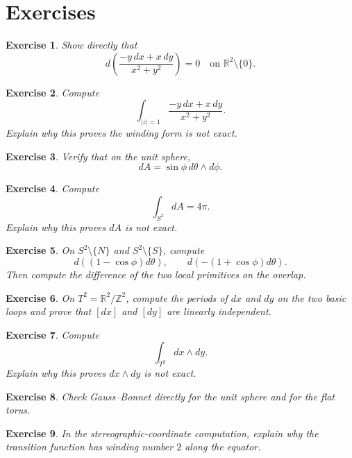 \documentclass[11pt]{article}
\newtheorem{exercise}{Exercise}
\begin{document}
	\section{Exercises}
	
	\begin{exercise}
		Show directly that
		\[
		d\!\left(\frac{-y\,dx+x\,dy}{x^2+y^2}\right)=0
		\quad\text{on }\mathbb{R}^2\setminus\{0\}.
		\]
	\end{exercise}
	
	\begin{exercise}
		Compute
		\[
		\int_{|z|=1}\frac{-y\,dx+x\,dy}{x^2+y^2}.
		\]
		Explain why this proves the winding form is not exact.
	\end{exercise}
	
	\begin{exercise}
		Verify that on the unit sphere,
		\[
		dA=\sin\phi\,d\theta\wedge d\phi.
		\]
	\end{exercise}
	
	\begin{exercise}
		Compute
		\[
		\int_{S^2}dA=4\pi.
		\]
		Explain why this proves \(dA\) is not exact.
	\end{exercise}
	
	\begin{exercise}
		On \(S^2\setminus\{N\}\) and \(S^2\setminus\{S\}\), compute
		\[
		d((1-\cos\phi)d\theta),
		\qquad
		d(-(1+\cos\phi)d\theta).
		\]
		Then compute the difference of the two local primitives on the overlap.
	\end{exercise}
	
	\begin{exercise}
		On \(T^2=\mathbb{R}^2/\mathbb{Z}^2\), compute the periods of \(dx\) and \(dy\) on the two basic loops and prove that \([dx]\) and \([dy]\) are linearly independent.
	\end{exercise}
	
	\begin{exercise}
		Compute
		\[
		\int_{T^2}dx\wedge dy.
		\]
		Explain why this proves \(dx\wedge dy\) is not exact.
	\end{exercise}
	
	\begin{exercise}
		Check Gauss--Bonnet directly for the unit sphere and for the flat torus.
	\end{exercise}
	
	\begin{exercise}
		In the stereographic-coordinate computation, explain why the transition function has winding number \(2\) along the equator.
	\end{exercise}
	
\end{document}
